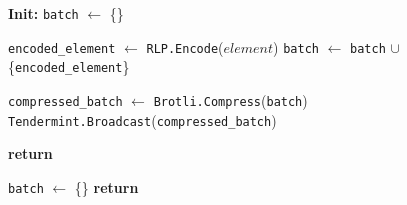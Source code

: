 \begin{figure}[t!]
  \begin{adjustbox}{minipage=[t]{\columnwidth}}
    \begin{algorithm}[H]
      \renewcommand{\thealgorithm}{Compress Collector}         
      \caption{}%
      \label{alg:collector-brotli}%
      \small
      \begin{algorithmic}[1]
            \State \textbf{Init:} \texttt{batch} $\leftarrow$ \{\}
      
            \label{alg:brotli_add_tx}
            			\State \texttt{encoded\_element} $\leftarrow$ \texttt{RLP.Encode}($element$)
					\State \texttt{batch} $\leftarrow$ \texttt{batch} $\cup$ \{\texttt{encoded\_element}\}
            
             			\State \texttt{compressed\_batch} $\leftarrow$  \texttt{Brotli.Compress}(\texttt{batch})
                			\State \texttt{Tendermint.Broadcast}(\texttt{compressed\_batch})
                			\State {}
             	   \EndIf
             	\EndIf
                	
                \State \textbf{return}
            \EndFunction
            
            \label{alg:brotli_reset}
            		\State \texttt{batch} $\leftarrow$ \{\}
                \State \textbf{return}
            \EndFunction
        \end{algorithmic}
      \end{algorithm}
	\end{adjustbox}
  \end{figure}


